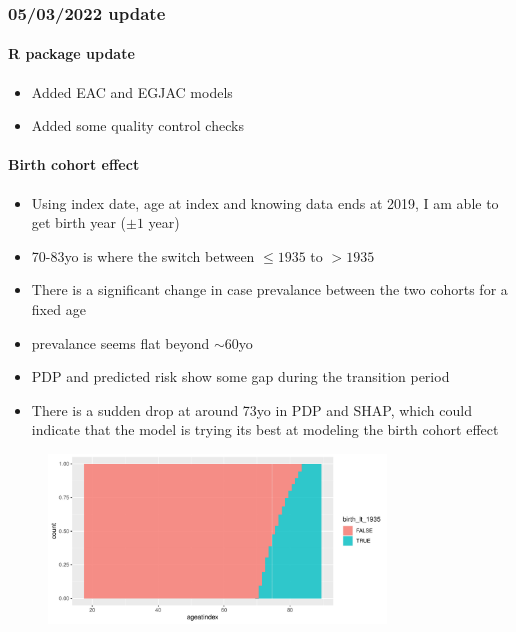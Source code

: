 \documentclass[12pt]{article}
\begin{document}
\clearpage
\pagebreak
\subsubsection*{05/03/2022 update}

\paragraph*{R package update}
\begin{itemize}
	\item Added EAC and EGJAC models
	\item Added some quality control checks
\end{itemize}


\clearpage
\pagebreak
\paragraph*{Birth cohort effect}
\begin{itemize}
	\item Using index date, age at index and knowing data ends at 2019,
	I am able to get birth year ($\pm 1$ year)
	\item 70-83yo is where the switch between $\leq 1935$ to $>1935$
	\item There is a significant change in case prevalance between the two cohorts
	for a fixed age
	\item prevalance seems flat beyond $\sim 60$yo
	\item PDP and predicted risk show some gap during the transition period
	\item There is a sudden drop at around 73yo in PDP and SHAP, which could
	indicate that the model is trying its best at modeling the birth cohort effect
\end{itemize}

\begin{figure}[h]
\centering
\includegraphics[width=0.8\textwidth]{figures/age_birth.pdf}
\end{figure}
\end{document}
